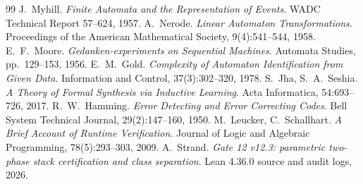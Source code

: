 \documentclass[11pt,a4paper,UTF8,fontset=none]{ctexart}
\begin{document}
\begin{thebibliography}{99}\setlength{\itemsep}{1pt}
 J.~Myhill. \emph{Finite Automata and the Representation of Events}. WADC Technical Report 57--624, 1957.
 A.~Nerode. \emph{Linear Automaton Transformations}. Proceedings of the American Mathematical Society, 9(4):541--544, 1958.
 E.~F.~Moore. \emph{Gedanken-experiments on Sequential Machines}. Automata Studies, pp.~129--153, 1956.
 E.~M.~Gold. \emph{Complexity of Automaton Identification from Given Data}. Information and Control, 37(3):302--320, 1978.
 S.~Jha, S.~A.~Seshia. \emph{A Theory of Formal Synthesis via Inductive Learning}. Acta Informatica, 54:693--726, 2017.
 R.~W.~Hamming. \emph{Error Detecting and Error Correcting Codes}. Bell System Technical Journal, 29(2):147--160, 1950.
 M.~Leucker, C.~Schallhart. \emph{A Brief Account of Runtime Verification}. Journal of Logic and Algebraic Programming, 78(5):293--303, 2009.
 A.~Strand. \emph{Gate 12 v12.3: parametric two-phase stack certification and class separation}. Lean 4.36.0 source and audit logs, 2026.
\end{thebibliography}
\end{document}
